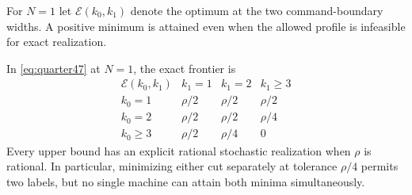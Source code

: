 For $N=1$ let $\mathcal E(k_0,k_1)$ denote the optimum at the two
command-boundary widths. A positive minimum is attained even when the
allowed profile is infeasible for exact realization.

\begin{theorem}\label{thm:frontier47}
In \eqref{eq:quarter47} at $N=1$, the exact frontier is
\begin{equation}\label{eq:frontiertable47}
\begin{array}{c|ccc}
 \mathcal E(k_0,k_1)&k_1=1&k_1=2&k_1\ge3\\\hline
 k_0=1&\rho/2&\rho/2&\rho/2\\
 k_0=2&\rho/2&\rho/2&\rho/4\\
 k_0\ge3&\rho/2&\rho/4&0
\end{array}
\end{equation}
Every upper bound has an explicit rational stochastic realization
when $\rho$ is rational. In particular, minimizing either cut
separately at tolerance $\rho/4$ permits two labels, but no single
machine can attain both minima simultaneously.
\end{theorem}
